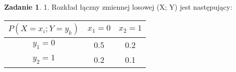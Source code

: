 \documentclass[11pt]{article}
\theoremstyle{definition}
\newtheorem{zadanie}{Zadanie}
\begin{document}
\begin{zadanie}
    1. Rozkład łączny zmiennej losowej (X; Y) jest następujący:

    \begin{table}[ht]
        \begin{tabular}{|c|c|c|}
            \hline
            $P(X = x_i; Y = y_k)$ & $x_1 = 0$ & $x_2 = 1$ \\

            \hline
            $y_1 = 0$             & 0.5       & 0.2       \\
            $y_2 = 1$             & 0.2       & 0.1       \\
            \hline
        \end{tabular}
    \end{table}
\end{zadanie}
\end{document}

